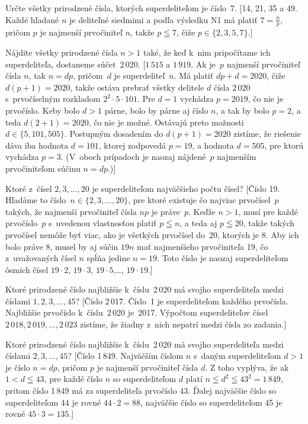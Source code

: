 {Určte všetky prirodzené čísla, ktorých superdeliteľom je číslo~7.
[14, 21, 35 a 49. Každé hľadané $n$ je deliteľné siedmimi a podľa
výsledku N1 má platiť $7=\frac np$, pričom $p$ je najmenší
prvočiniteľ $n$, takže $p\leqq7$, čiže $p\in\{2,3,5,7\}$.]

\D
Nájdite všetky prirodzené čísla $n>1$ také, že
keď k~nim pripočítame ich superdeliteľa, dostaneme súčet~2\,020.
[$1\,515$ a $1\,919$. Ak je~$p$ najmenší prvočiniteľ čísla $n$, tak $n=dp$,
pričom~$d$ je superdeliteľ~$n$. Má platiť $dp+d=2020$, čiže
$d(p+1)=2020$, takže ostáva prebrať všetky delitele $d$ čísla
$2\,020$ s~prvočíselným rozkladom $2^2\cdot5\cdot101$.
Pre $d=1$ vychádza $p=2019$, čo nie je prvočíslo.
Keby bolo $d>1$ párne, bolo by párne aj číslo $n$, a tak
by bolo $p=2$, a teda $d(2+1)=2020$, čo nie je možné.
Ostávajú preto možnosti $d\in\{5,101,505\}$. Postupným dosadením
do $d(p+1)=2020$ zistíme, že riešenie dáva iba hodnota $d=101$,
ktorej zodpovedá $p=19$, a hodnota $d=505$, pre ktorú vychádza $p=3$.
(V~oboch prípadoch je naozaj nájdené~$p$ najmenším
prvočiniteľom súčinu $n=dp$.)]

Ktoré z~čísel $2,3,\ldots,20$ je superdeliteľom najväčšieho
počtu čísel?
[Číslo 19. Hľadáme to číslo~$n\in\{2,3,\ldots,20\}$, pre ktoré existuje čo
najviac prvočísel~$p$ takých,
že najmenší prvočiniteľ čísla $np$ je práve~$p$.
Keďže $n>1$, musí pre každé prvočíslo~$p$
s~uvedenou vlastnosťou platiť $p\leqq n$, a teda aj $p\leqq 20$,
takže takých prvočísel nemôže byť viac, ako je všetkých
prvočísel do~20, ktorých je 8. Aby ich bolo práve 8,
musel by aj súčin $19n$ mať najmenšieho prvočiniteľa 19, čo
z~uvažovaných čísel $n$ spĺňa jedine $n=19$. Toto číslo je
naozaj superdeliteľom ôsmich čísel $19\cdot 2$, $19\cdot 3$, $19\cdot
5$,\dots, $19\cdot19$.]

Ktoré prirodzené číslo najbližšie k~číslu~2\,020 má
svojho superdeliteľa medzi číslami $1,2,3,\ldots,45$?
[Číslo 2\,017. Číslo~1 je superdeliteľom každého prvočísla.
Najbližšie prvočíslo k~číslu~2\,020 je~2017. Výpočtom superdeliteľov
čísel $2\,018,2\,019,\ldots,2\,023$ zistíme, že žiadny
z~nich nepatrí medzi čísla zo zadania.]

Ktoré prirodzené číslo najbližšie k~číslu~2\,020 má
svojho superdeliteľa medzi číslami $2,3,\ldots,45$?
[Číslo 1\,849.
Najväčším číslom $n$ s~daným superdeliteľom
$d>1$ je číslo $n=dp$, pričom $p$ je najmenší prvočiniteľ čísla $d$.
Z toho vyplýva, že ak $1<d\leqq43$, pre každé číslo $n$ so
superdeliteľom $d$ platí $n\leqq d^2\leqq43^2=1\,849$, pritom číslo
1\,849 má za superdeliteľa prvočíslo 43. Ďalej najväčšie číslo so
superdeliteľom 44 je rovné $44\cdot2=88$, najväčšie číslo so
superdeliteľom 45 je rovné $45\cdot3=135$.]
}

